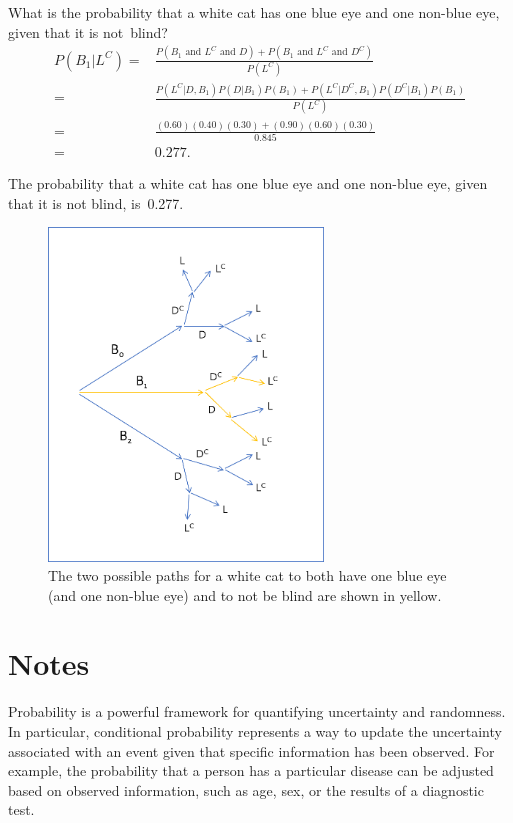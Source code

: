 \begin{examplewrap}
\begin{nexample}{What is the probability that a white cat has one blue eye and one non-blue eye, given that it is not~blind?}
	\begin{align*}
	P(B_1|L^C) =& \frac{P(B_1 \textrm{ and } L^C \textrm{ and } D) + P(B_1 \textrm{ and } L^C \textrm{ and } D^C)}{P(L^C)}\\
	=& \frac{P(L^C|D, B_1)P(D|B_1)P(B_1) + P(L^C|D^C, B_1)P(D^C|B_1)P(B_1)}{P(L^C)} \\
	=& \frac{(0.60)(0.40)(0.30) + (0.90)(0.60)(0.30)}{0.845} \\
	=& 0.277.
	\end{align*} 
	
	The probability that a white cat has one blue eye and one non-blue eye, given that it is not blind, is~0.277.
\end{nexample}
\end{examplewrap}

\begin{figure}[h]
\centering
\includegraphics[width=0.65\textwidth]{ch_probability_oi_biostat/figures/catGeneticsTrees/catGeneticsTreesC}
\caption{The two possible paths for a white cat to both have one blue eye (and one non-blue eye) and to not be blind are shown in yellow.}
\label{catGeneticsTreesC}
\end{figure}
	

\section{Notes}
\label{notesChapterProbability}

Probability is a powerful framework for quantifying uncertainty and randomness. In particular, conditional probability represents a way to update the uncertainty associated with an event given that specific information has been observed. For example, the probability that a person has a particular disease can be adjusted based on observed information, such as age, sex, or the results of a diagnostic test.

